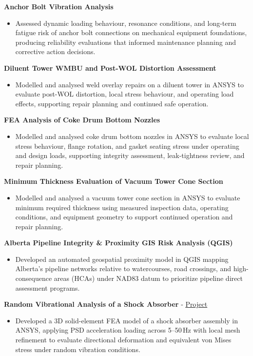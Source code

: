 \documentclass[10pt, letterpaper]{article}
\newcommand{\projhead}[1]{\vspace{5pt}\textbf{#1}\par\vspace{1pt}}
\newcommand{\projheadlink}[3]{\vspace{5pt}\textbf{#1} - \href{#3}{\textcolor{linkblue}{\underline{#2}}}\par\vspace{1pt}}
\begin{document}
\projhead{Anchor Bolt Vibration Analysis}
\begin{itemize}
  \item Assessed dynamic loading behaviour, resonance conditions, and long-term fatigue risk of anchor bolt connections on mechanical equipment foundations, producing reliability evaluations that informed maintenance planning and corrective action decisions.
\end{itemize}

\projhead{Diluent Tower WMBU and Post-WOL Distortion Assessment}
\begin{itemize}
  \item Modelled and analysed weld overlay repairs on a diluent tower in ANSYS to evaluate post-WOL distortion, local stress behaviour, and operating load effects, supporting repair planning and continued safe operation.
\end{itemize}

\projhead{FEA Analysis of Coke Drum Bottom Nozzles}
\begin{itemize}
  \item Modelled and analysed coke drum bottom nozzles in ANSYS to evaluate local stress behaviour, flange rotation, and gasket seating stress under operating and design loads, supporting integrity assessment, leak-tightness review, and repair planning.
\end{itemize}

\projhead{Minimum Thickness Evaluation of Vacuum Tower Cone Section}
\begin{itemize}
  \item Modelled and analysed a vacuum tower cone section in ANSYS to evaluate minimum required thickness using measured inspection data, operating conditions, and equipment geometry to support continued operation and repair planning.
\end{itemize}

\projhead{Alberta Pipeline Integrity \& Proximity GIS Risk Analysis (QGIS)}
\begin{itemize}
  \item Developed an automated geospatial proximity model in QGIS mapping Alberta's pipeline networks relative to watercourses, road crossings, and high-consequence areas (HCAs) under NAD83 datum to prioritize pipeline direct assessment programs.
\end{itemize}

\projheadlink{Random Vibrational Analysis of a Shock Absorber}{Project}{https://www.linkedin.com/posts/jaykumar-prajapati_random-vibrational-analysis-jay-prajapati-activity-7473476786862047232-W8oJ}
\begin{itemize}
  \item Developed a 3D solid-element FEA model of a shock absorber assembly in ANSYS, applying PSD acceleration loading across 5--50\,Hz with local mesh refinement to evaluate directional deformation and equivalent von Mises stress under random vibration conditions.
\end{itemize}
\end{document}

